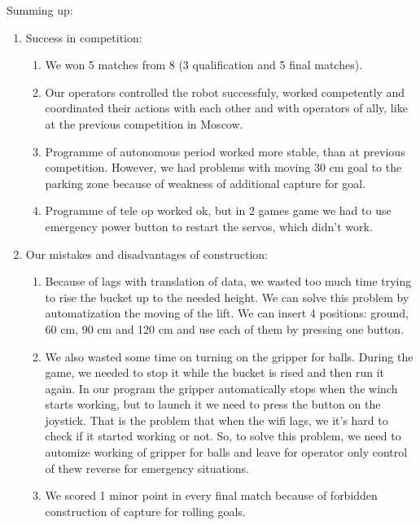 Summing up:
\begin{enumerate}
	\item Success in competition:
	\begin{enumerate}
		
		\item We won 5 matches from 8 (3 qualification and 5 final matches).
		
		\item Our operators controlled the robot successfuly, worked competently and coordinated their actions with each other and with operators of ally, like at the previous competition in Moscow.

		\item Programme of autonomous period worked more stable, than at previous competition. However, we had problems with moving 30 cm goal to the parking zone because of weakness of additional capture for goal.
		
		\item Programme of tele op worked ok, but in 2 games game we had to use emergency power button to restart the servos, which didn't work.
		
	\end{enumerate}
	
	\item Our mistakes and disadvantages of construction:
	\begin{enumerate}
		\item Because of lags with translation of data, we wasted too much time trying to rise the bucket up to the needed height. We can solve this problem by automatization the moving of the lift. We can insert 4 positions: ground, 60 cm, 90 cm and 120 cm and use each of them by pressing one button.
		
		\item We also wasted some time on turning on the gripper for balls. During the game, we needed to stop it while the bucket is rised and then run it again. In our program the gripper automatically stops when the winch starts working, but to launch it we need to press the button on the joystick. That is the problem that when the wifi lags, we it's hard to check if it started working or not. So, to solve this problem, we need to automize working of gripper for balls and leave for operator only control of thew reverse for emergency situations.
		
		\item We scored 1 minor point in every final match because of forbidden construction of capture for rolling goals.
		

\end{enumerate}
\end{enumerate}
